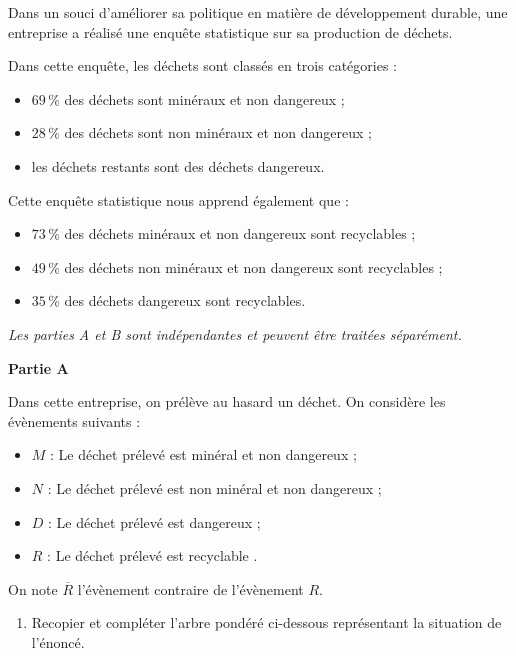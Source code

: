 Dans un souci d'améliorer sa politique en matière de développement durable, une entreprise a réalisé une enquête statistique sur sa production de déchets.

Dans cette enquête, les déchets sont classés en trois catégories :

\begin{itemize}
	\item $69\,\%$ des déchets sont minéraux et non dangereux ;
	\item $28\,\%$ des déchets sont non minéraux et non dangereux ;
	\item les déchets restants sont des déchets dangereux.
\end{itemize}

Cette enquête statistique nous apprend également que :

\begin{itemize}
	\item $73$\,\% des déchets minéraux et non dangereux sont recyclables ;
	\item $49$\,\% des déchets non minéraux et non dangereux sont recyclables ;
	\item $35$\,\% des déchets dangereux sont recyclables.
\end{itemize}

\emph{Les parties A et B sont indépendantes et peuvent être traitées séparément.}

\medskip

\textbf{Partie A}

\medskip

Dans cette entreprise, on prélève au hasard un déchet. On considère les évènements suivants :

\begin{itemize}
	\item $M$ : \og Le déchet prélevé est minéral et non dangereux \fg{} ;
	\item $N$ : \og Le déchet prélevé est non minéral et non dangereux \fg{} ;
	\item $D$ : \og Le déchet prélevé est dangereux \fg{} ;
	\item $R$ : \og Le déchet prélevé est recyclable \fg.
\end{itemize}

On note $\overline{R}$ l'évènement contraire de l'évènement $R$.

\begin{enumerate}
	\item Recopier et compléter l'arbre pondéré ci-dessous représentant la situation de l'énoncé.
\end{enumerate}

